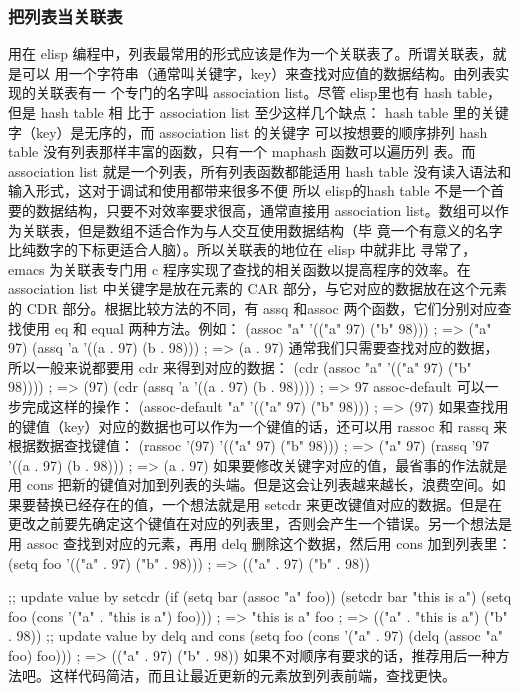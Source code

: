 \documentclass[11pt]{ctexart}
\begin{document}
\subsubsection{把列表当关联表}
\label{sec:org27c1896}
用在 elisp 编程中，列表最常用的形式应该是作为一个关联表了。所谓关联表，就是可以
用一个字符串（通常叫关键字，key）来查找对应值的数据结构。由列表实现的关联表有一
个专门的名字叫 association list。尽管 elisp里也有 hash table，但是 hash table 相
比于 association list 至少这样几个缺点：
hash table 里的关键字（key）是无序的，而 association list 的关键字 可以按想要的顺序排列
hash table 没有列表那样丰富的函数，只有一个 maphash 函数可以遍历列 表。而
association list 就是一个列表，所有列表函数都能适用
hash table 没有读入语法和输入形式，这对于调试和使用都带来很多不便
所以 elisp的hash table 不是一个首要的数据结构，只要不对效率要求很高，通常直接用
association list。数组可以作为关联表，但是数组不适合作为与人交互使用数据结构（毕
竟一个有意义的名字比纯数字的下标更适合人脑）。所以关联表的地位在 elisp 中就非比
寻常了，emacs 为关联表专门用 c 程序实现了查找的相关函数以提高程序的效率。在
association list 中关键字是放在元素的 CAR 部分，与它对应的数据放在这个元素的 CDR
部分。根据比较方法的不同，有 assq 和assoc 两个函数，它们分别对应查找使用 eq 和
equal 两种方法。例如：
(assoc "a" '(("a" 97) ("b" 98)))        ; => ("a" 97)
(assq 'a '((a . 97) (b . 98)))          ; => (a . 97)
通常我们只需要查找对应的数据，所以一般来说都要用 cdr 来得到对应的数据：
(cdr (assoc "a" '(("a" 97) ("b" 98))))  ; => (97)
(cdr (assq 'a '((a . 97) (b . 98))))    ; => 97
assoc-default 可以一步完成这样的操作：
(assoc-default "a" '(("a" 97) ("b" 98)))          ; => (97)
如果查找用的键值（key）对应的数据也可以作为一个键值的话，还可以用 rassoc 和 rassq 来根据数据查找键值：
(rassoc '(97) '(("a" 97) ("b" 98)))     ; => ("a" 97)
(rassq '97 '((a . 97) (b . 98)))        ; => (a . 97)
如果要修改关键字对应的值，最省事的作法就是用 cons 把新的键值对加到列表的头端。但是这会让列表越来越长，浪费空间。如果要替换已经存在的值，一个想法就是用 setcdr 来更改键值对应的数据。但是在更改之前要先确定这个键值在对应的列表里，否则会产生一个错误。另一个想法是用 assoc 查找到对应的元素，再用 delq 删除这个数据，然后用 cons 加到列表里：
(setq foo '(("a" . 97) ("b" . 98)))     ; => (("a" . 97) ("b" . 98))

;; update value by setcdr
(if (setq bar (assoc "a" foo))
(setcdr bar "this is a")
(setq foo (cons '("a" . "this is a") foo))) ; => "this is a"
foo                         ; => (("a" . "this is a") ("b" . 98))
;; update value by delq and cons
(setq foo (cons '("a" . 97)
(delq (assoc "a" foo) foo))) ; => (("a" . 97) ("b" . 98))
如果不对顺序有要求的话，推荐用后一种方法吧。这样代码简洁，而且让最近更新的元素放到列表前端，查找更快。
\end{document}
